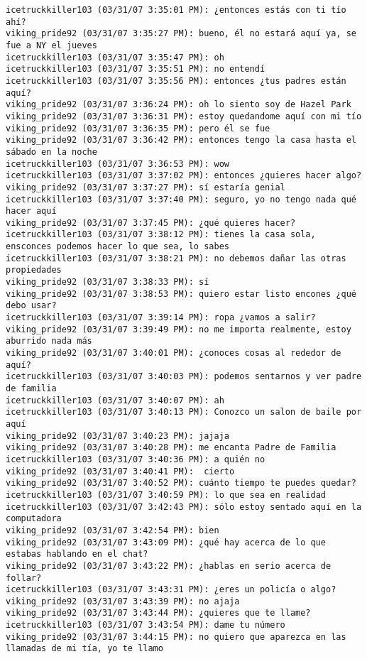 \begin{verbatim}
icetruckkiller103 (03/31/07 3:35:01 PM): ¿entonces estás con ti tío ahí?
viking_pride92 (03/31/07 3:35:27 PM): bueno, él no estará aquí ya, se fue a NY el jueves
icetruckkiller103 (03/31/07 3:35:47 PM): oh
icetruckkiller103 (03/31/07 3:35:51 PM): no entendí
icetruckkiller103 (03/31/07 3:35:56 PM): entonces ¿tus padres están aquí?
viking_pride92 (03/31/07 3:36:24 PM): oh lo siento soy de Hazel Park
viking_pride92 (03/31/07 3:36:31 PM): estoy quedandome aquí con mi tío
viking_pride92 (03/31/07 3:36:35 PM): pero él se fue
viking_pride92 (03/31/07 3:36:42 PM): entonces tengo la casa hasta el sábado en la noche 
icetruckkiller103 (03/31/07 3:36:53 PM): wow
icetruckkiller103 (03/31/07 3:37:02 PM): entonces ¿quieres hacer algo?
viking_pride92 (03/31/07 3:37:27 PM): sí estaría genial
icetruckkiller103 (03/31/07 3:37:40 PM): seguro, yo no tengo nada qué hacer aquí
viking_pride92 (03/31/07 3:37:45 PM): ¿qué quieres hacer?
icetruckkiller103 (03/31/07 3:38:12 PM): tienes la casa sola, ensconces podemos hacer lo que sea, lo sabes
icetruckkiller103 (03/31/07 3:38:21 PM): no debemos dañar las otras propiedades
viking_pride92 (03/31/07 3:38:33 PM): sí
viking_pride92 (03/31/07 3:38:53 PM): quiero estar listo encones ¿qué debo usar?
icetruckkiller103 (03/31/07 3:39:14 PM): ropa ¿vamos a salir?
viking_pride92 (03/31/07 3:39:49 PM): no me importa realmente, estoy aburrido nada más
viking_pride92 (03/31/07 3:40:01 PM): ¿conoces cosas al rededor de aquí?
icetruckkiller103 (03/31/07 3:40:03 PM): podemos sentarnos y ver padre de familia
icetruckkiller103 (03/31/07 3:40:07 PM): ah
icetruckkiller103 (03/31/07 3:40:13 PM): Conozco un salon de baile por aquí 
viking_pride92 (03/31/07 3:40:23 PM): jajaja
viking_pride92 (03/31/07 3:40:28 PM): me encanta Padre de Familia
icetruckkiller103 (03/31/07 3:40:36 PM): a quién no
viking_pride92 (03/31/07 3:40:41 PM):  cierto
viking_pride92 (03/31/07 3:40:52 PM): cuánto tiempo te puedes quedar?
icetruckkiller103 (03/31/07 3:40:59 PM): lo que sea en realidad
icetruckkiller103 (03/31/07 3:42:43 PM): sólo estoy sentado aquí en la computadora
viking_pride92 (03/31/07 3:42:54 PM): bien 
viking_pride92 (03/31/07 3:43:09 PM): ¿qué hay acerca de lo que estabas hablando en el chat? 
viking_pride92 (03/31/07 3:43:22 PM): ¿hablas en serio acerca de follar?
icetruckkiller103 (03/31/07 3:43:31 PM): ¿eres un policía o algo?
viking_pride92 (03/31/07 3:43:39 PM): no ajaja
viking_pride92 (03/31/07 3:43:44 PM): ¿quieres que te llame?
icetruckkiller103 (03/31/07 3:43:54 PM): dame tu número
viking_pride92 (03/31/07 3:44:15 PM): no quiero que aparezca en las llamadas de mi tía, yo te llamo 

\end{verbatim}
